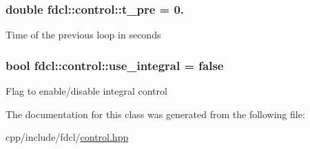 \subsubsection[{\texorpdfstring{t\+\_\+pre}{t_pre}}]{\setlength{\rightskip}{0pt plus 5cm}double fdcl\+::control\+::t\+\_\+pre = 0.}\hypertarget{classfdcl_1_1control_ae8000fb9172118f05c69f9fb265b55ef}{}\label{classfdcl_1_1control_ae8000fb9172118f05c69f9fb265b55ef}
Time of the previous loop in seconds 
\subsubsection[{\texorpdfstring{use\+\_\+integral}{use_integral}}]{\setlength{\rightskip}{0pt plus 5cm}bool fdcl\+::control\+::use\+\_\+integral = false}\hypertarget{classfdcl_1_1control_a02b30bdec43753deab3f657562a59065}{}\label{classfdcl_1_1control_a02b30bdec43753deab3f657562a59065}
Flag to enable/disable integral control 

The documentation for this class was generated from the following file\+:\begin{DoxyCompactItemize}
\item 
cpp/include/fdcl/\hyperlink{control_8hpp}{control.\+hpp}\end{DoxyCompactItemize}

